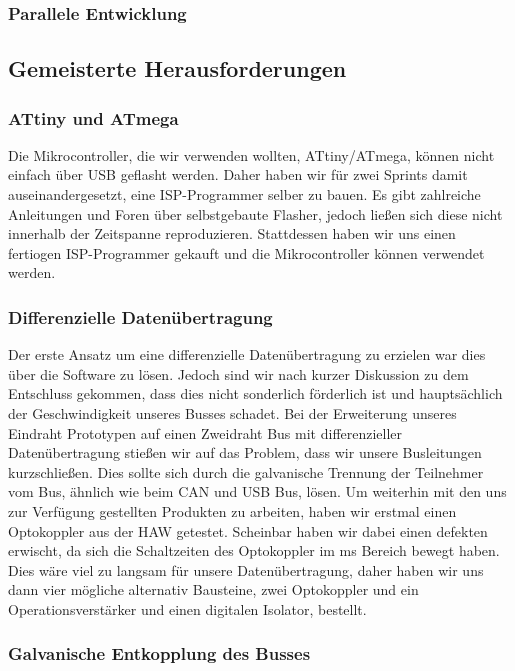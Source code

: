 \subsubsection{Parallele Entwicklung}

\subsection{Gemeisterte Herausforderungen}
\subsubsection{ATtiny und ATmega}
Die Mikrocontroller, die wir verwenden wollten, ATtiny/ATmega, können nicht einfach über USB geflasht werden. Daher haben wir für zwei Sprints damit auseinandergesetzt, eine ISP-Programmer selber zu bauen. Es gibt zahlreiche Anleitungen und Foren über selbstgebaute Flasher, jedoch ließen sich diese nicht innerhalb der Zeitspanne reproduzieren. Stattdessen haben wir uns einen fertiogen ISP-Programmer gekauft und die Mikrocontroller können verwendet werden.

\subsubsection{Differenzielle Datenübertragung}
Der erste Ansatz um eine differenzielle Datenübertragung zu erzielen war dies über die Software zu lösen. Jedoch sind wir nach kurzer Diskussion zu dem Entschluss gekommen, dass dies nicht sonderlich förderlich ist und hauptsächlich der Geschwindigkeit unseres Busses schadet.
Bei der Erweiterung unseres Eindraht Prototypen auf einen Zweidraht Bus mit differenzieller Datenübertragung stießen wir auf das Problem, dass wir unsere Busleitungen kurzschließen. Dies sollte sich durch die galvanische Trennung der Teilnehmer vom Bus, ähnlich wie beim CAN und USB Bus, lösen.
Um weiterhin mit den uns zur Verfügung gestellten Produkten zu arbeiten, haben wir erstmal einen Optokoppler aus der HAW getestet. Scheinbar haben wir dabei einen defekten erwischt, da sich die Schaltzeiten des Optokoppler im ms Bereich bewegt haben. Dies wäre viel zu langsam für unsere Datenübertragung, daher haben wir uns dann vier mögliche alternativ Bausteine, zwei Optokoppler und ein Operationsverstärker und einen digitalen Isolator, bestellt.
\\

\subsubsection{Galvanische Entkopplung des Busses}

